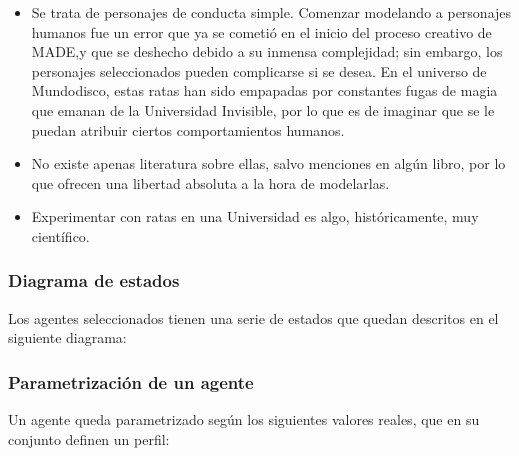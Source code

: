 \begin{itemize}
\item Se trata de personajes de conducta simple. Comenzar modelando a personajes humanos fue un error que ya se cometió en el inicio del proceso creativo de MADE,y que se deshecho debido a su inmensa complejidad; sin embargo, los personajes seleccionados pueden complicarse si se desea. En el universo de Mundodisco, estas ratas han sido empapadas por constantes fugas de magia que emanan de la Universidad Invisible, por lo que es de imaginar que se le puedan atribuir ciertos comportamientos humanos.
\item No existe apenas literatura sobre ellas, salvo menciones en algún libro, por lo que ofrecen una libertad absoluta a la hora de modelarlas.
\item Experimentar con ratas en una Universidad es algo, históricamente, muy científico.
\end{itemize}

\subsubsection{Diagrama de estados}

Los agentes seleccionados tienen una serie de estados que quedan descritos en el siguiente diagrama:


\subsubsection{Parametrización de un agente}

Un agente queda parametrizado según los siguientes valores reales, que en su conjunto definen un perfil:

